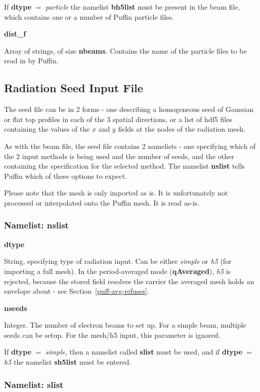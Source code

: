 \documentclass[12pt]{article}%
\begin{document}
If {\bf dtype} $=$ {\it particle} the namelist {\bf bh5list} must be present in the beam file, which contains one or a number of Puffin particle files.

{\bf dist\_f}

Array of strings, of size {\bf nbeams}. Contains the name of the particle files to be read in by Puffin.



\newpage

\subsection{Radiation Seed Input File}

The seed file can be in 2 forms - one describing a homogeneous seed of Gaussian or flat top profiles in each of the 3 spatial directions, or a list of hdf5 files containing the values of the $x$ and $y$ fields at the nodes of the radiation mesh.

As with the beam file, the seed file contains 2 namelists - one specifying which of the 2 input methods is being used and the number of seeds, and the other containing the specification for the selected method. The namelist {\bf nslist} tells Puffin which of these options to expect.

Please note that the mesh is only imported as is. It is unfortunately not processed or interpolated onto the Puffin mesh. It is read as-is.


\subsubsection{Namelist: nslist}

{\bf dtype}

String, specifying type of radiation input. Can be either {\it simple} or {\it h5} (for importing a full mesh). In the period-averaged mode ({\bf qAveraged}), {\it h5} is rejected, because the stored field resolves the carrier the averaged mesh holds an envelope about - see Section~\ref{puff-avg-refuses}.

{\bf nseeds}

Integer. The number of electron beams to set up. For a simple beam, multiple seeds can be setup. For the mesh/h5 input, this parameter is ignored.

If {\bf dtype} $=$ {\it simple}, then a namelist called {\bf slist} must be used, and if {\bf dtype} $=$ {\it h5} the namelist {\bf sh5list} must be entered.

\subsubsection{Namelist: slist}
\end{document}
